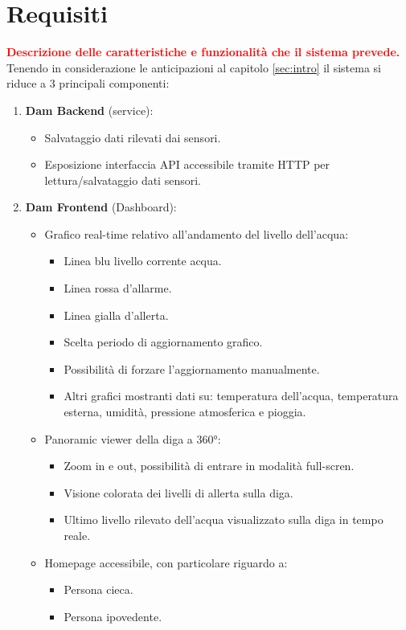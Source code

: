 \documentclass{article}
\begin{document}
\section{Requisiti}
\textcolor{red}{\textbf{Descrizione delle caratteristiche e funzionalità che il sistema prevede.}} %
Tenendo in considerazione le anticipazioni al capitolo \ref{sec:intro} il sistema si riduce a 3 principali componenti:
\begin{enumerate}
	\item \textbf{Dam Backend} (service):
	\begin{itemize}
		\item Salvataggio dati rilevati dai sensori.
		\item Esposizione interfaccia API accessibile tramite HTTP per lettura/salvataggio dati sensori.
	\end{itemize} 
	\item \textbf{Dam Frontend} (Dashboard):
	\begin{itemize}
		\item Grafico real-time relativo all'andamento del livello dell'acqua:
		\begin{itemize}
			\item Linea blu livello corrente acqua.
			\item Linea rossa d'allarme.
			\item Linea gialla d'allerta.
			\item Scelta periodo di aggiornamento grafico.
			\item Possibilità di forzare l'aggiornamento manualmente.
			\item Altri grafici mostranti dati su: temperatura dell'acqua, temperatura esterna, umidità, pressione atmosferica e pioggia.
		\end{itemize}
		\item Panoramic viewer della diga a 360°:
		\begin{itemize}
			\item Zoom in e out, possibilità di entrare in modalità full-scren.
			\item Visione colorata dei livelli di allerta sulla diga.
			\item Ultimo livello rilevato dell'acqua visualizzato sulla diga in tempo reale.
		\end{itemize}
		\item Homepage accessibile, con particolare riguardo a:
		\begin{itemize}
			\item Persona cieca.
			\item Persona ipovedente.

\end{itemize}
\end{itemize}
\end{enumerate}
\end{document}
